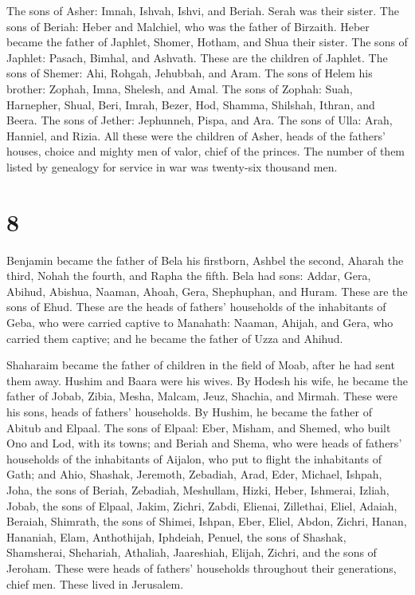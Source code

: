  The sons of Asher: Imnah, Ishvah, Ishvi, and Beriah.
Serah was their sister.  The sons of Beriah: Heber and
Malchiel, who was the father of Birzaith.  Heber became
the father of Japhlet, Shomer, Hotham, and Shua their sister.
 The sons of Japhlet: Pasach, Bimhal, and Ashvath. These
are the children of Japhlet.  The sons of Shemer: Ahi,
Rohgah, Jehubbah, and Aram.  The sons of Helem his
brother: Zophah, Imna, Shelesh, and Amal.  The sons of
Zophah: Suah, Harnepher, Shual, Beri, Imrah,  Bezer, Hod,
Shamma, Shilshah, Ithran, and Beera.  The sons of Jether:
Jephunneh, Pispa, and Ara.  The sons of Ulla: Arah,
Hanniel, and Rizia.  All these were the children of
Asher, heads of the fathers' houses, choice and mighty men of valor,
chief of the princes. The number of them listed by genealogy for service
in war was twenty-six thousand men.

\hypertarget{section-7}{%
\section{8}\label{section-7}}

 Benjamin became the father of Bela his firstborn, Ashbel
the second, Aharah the third,  Nohah the fourth, and Rapha
the fifth.  Bela had sons: Addar, Gera, Abihud,
 Abishua, Naaman, Ahoah,  Gera, Shephuphan,
and Huram.  These are the sons of Ehud. These are the
heads of fathers' households of the inhabitants of Geba, who were
carried captive to Manahath:  Naaman, Ahijah, and Gera,
who carried them captive; and he became the father of Uzza and Ahihud.

 Shaharaim became the father of children in the field of
Moab, after he had sent them away. Hushim and Baara were his wives.
 By Hodesh his wife, he became the father of Jobab, Zibia,
Mesha, Malcam,  Jeuz, Shachia, and Mirmah. These were his
sons, heads of fathers' households.  By Hushim, he became
the father of Abitub and Elpaal.  The sons of Elpaal:
Eber, Misham, and Shemed, who built Ono and Lod, with its towns;
 and Beriah and Shema, who were heads of fathers'
households of the inhabitants of Aijalon, who put to flight the
inhabitants of Gath;  and Ahio, Shashak, Jeremoth,
 Zebadiah, Arad, Eder,  Michael, Ishpah,
Joha, the sons of Beriah,  Zebadiah, Meshullam, Hizki,
Heber,  Ishmerai, Izliah, Jobab, the sons of Elpaal,
 Jakim, Zichri, Zabdi,  Elienai,
Zillethai, Eliel,  Adaiah, Beraiah, Shimrath, the sons of
Shimei,  Ishpan, Eber, Eliel,  Abdon,
Zichri, Hanan,  Hananiah, Elam, Anthothijah,
 Iphdeiah, Penuel, the sons of Shashak, 
Shamsherai, Shehariah, Athaliah,  Jaareshiah, Elijah,
Zichri, and the sons of Jeroham.  These were heads of
fathers' households throughout their generations, chief men. These lived
in Jerusalem.

